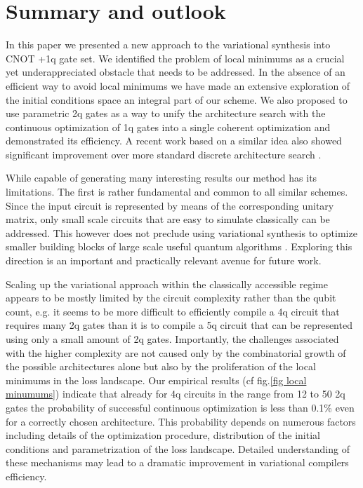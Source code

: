 \documentclass[twocolumn, amsfonts, amssymb, aps, nofootinbib]{revtex4-2}
\newcommand{\CX}{CNOT }
\begin{document}
\section{Summary and outlook \label{sec last}}
In this paper we presented a new approach to the variational synthesis into \CX+1q gate set. We identified the problem of local minimums as a crucial yet underappreciated obstacle that needs to be addressed. In the absence of an efficient way to avoid local minimums we have made an extensive exploration of the initial conditions space an integral part of our scheme. We also proposed to use parametric 2q gates as a way to unify the architecture search with the continuous optimization of 1q gates into a single coherent optimization and demonstrated its efficiency. A recent work based on a similar idea \cite{Rakyta2022} also showed significant improvement over more standard discrete architecture search \cite{Smith2021}. 

While capable of generating many interesting results our method has its limitations. The first is rather fundamental and common to all similar schemes. Since the input circuit is represented by means of the corresponding unitary matrix, only small scale circuits that are easy to simulate classically can be addressed. This however does not preclude using variational synthesis to optimize smaller building blocks of large scale useful quantum algorithms \cite{Younis2021}. Exploring this direction is an important and practically relevant avenue for future work.

Scaling up the variational approach within the classically accessible regime appears to be mostly limited by the circuit complexity rather than the qubit count, e.g. it seems to be more difficult to efficiently compile a 4q circuit that requires many 2q gates than it is to compile a 5q circuit that can be represented using only a small amount of 2q gates. Importantly, the challenges associated with the higher complexity are not caused only by the combinatorial growth of the possible architectures alone but also by the proliferation of the local minimums in the loss landscape. Our empirical results (cf fig.\ref{fig local minumums}) indicate that already for 4q circuits in the range from 12 to 50 2q gates the probability of successful continuous optimization is less than 0.1\% even for a correctly chosen architecture. This probability depends on numerous factors including details of the optimization procedure, distribution of the initial conditions and parametrization of the loss landscape. Detailed understanding of these mechanisms may lead to a dramatic improvement in variational compilers efficiency.
\end{document}

